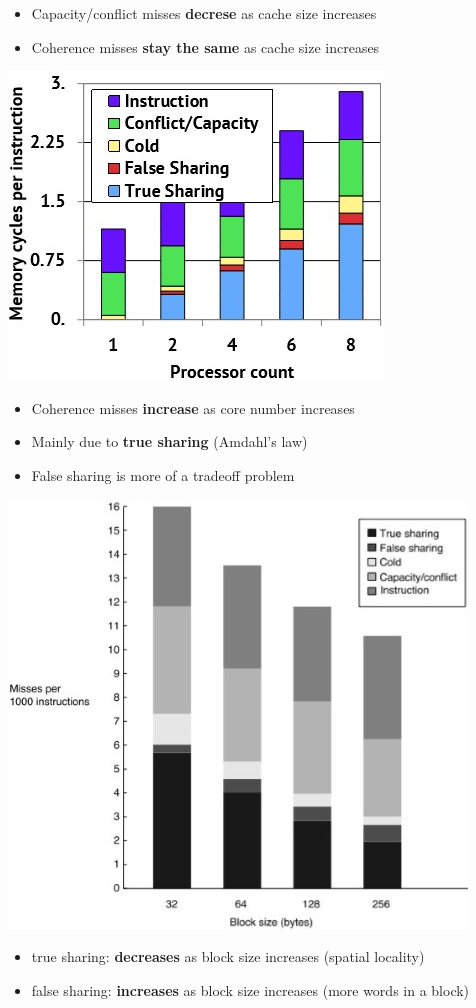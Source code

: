 \documentclass[letterpaper,12pt]{article}
\begin{document}
\begin{itemize}
    \item Capacity/conflict misses \textbf{decrese} as cache size increases
    \item Coherence misses \textbf{stay the same} as cache size increases
\end{itemize}

\includegraphics*[scale=0.7]{./Image/Coherence misses and core number.jpg}

\begin{itemize}
    \item Coherence misses \textbf{increase} as core number increases
    \item Mainly due to \textbf{true sharing} (Amdahl's law)
    \item False sharing is more of a tradeoff problem
\end{itemize}

\includegraphics*[scale=0.7]{./Image/Coherence miss and block size.jpg}
\begin{itemize}
    \item true sharing: \textbf{decreases} as block size increases (spatial locality)
    \item false sharing: \textbf{increases} as block size increases (more words in a block)
\end{itemize}
\end{document}
